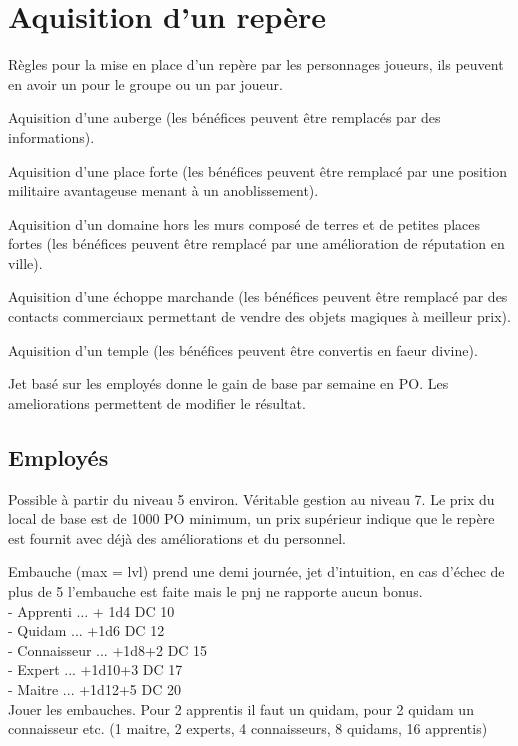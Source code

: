 \section*{Aquisition d'un repère}
 Règles pour la mise en place d'un repère par les personnages joueurs, ils peuvent en avoir un pour le groupe ou un par joueur.

Aquisition d'une auberge (les bénéfices peuvent être remplacés par des informations).

Aquisition d'une place forte (les bénéfices peuvent être remplacé par une position militaire avantageuse menant à un anoblissement).

Aquisition d'un domaine hors les murs composé de terres et de petites places fortes (les bénéfices peuvent être remplacé par une amélioration de réputation en ville).

Aquisition d'une échoppe marchande (les bénéfices peuvent être remplacé par des contacts commerciaux permettant de vendre des objets magiques à meilleur prix).

Aquisition d'un temple (les bénéfices peuvent être convertis en faeur divine).

Jet basé sur les employés donne le gain de base par semaine en PO. Les ameliorations permettent de modifier le résultat. 

\subsection*{Employés}

Possible à partir du niveau 5 environ. Véritable gestion au niveau 7. Le prix du local de base est de 1000 PO minimum, un prix supérieur indique que le repère est fournit avec déjà des améliorations et du personnel.

Embauche (max = lvl) prend une demi journée, jet d'intuition, en cas d'échec de plus de 5 l'embauche est faite mais le pnj ne rapporte aucun bonus. \\
 - Apprenti ... + 1d4 DC 10 \\
 - Quidam ... +1d6 DC 12 \\
 - Connaisseur ... +1d8+2 DC 15 \\
 - Expert ... +1d10+3 DC 17 \\
 - Maitre ... +1d12+5 DC 20 \\


Jouer les embauches. Pour 2 apprentis il faut un quidam, pour 2 quidam un connaisseur etc. (1 maitre, 2 experts, 4 connaisseurs, 8 quidams, 16 apprentis)

